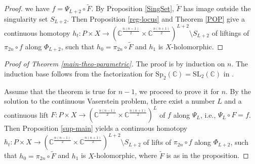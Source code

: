 \documentclass[10pt]{amsart}
\theoremstyle{remark}
\begin{document}
\begin{proof}
we have $f = \Psi_{L+2} \circ \tilde F$. By Proposition \ref{SingSet}, $\tilde{F}$ has image outside the singularity set $S_{L+2}$. Then Proposition \ref{reg-locus} and Theorem \ref{POP} give a continuous homotopy $h_t: P \times X \to (\mathbb{C}^{\frac{n(n-1)}{2}} \times \mathbb{C}^{\frac{n(n+1)}{2}})^{L+2}\setminus S_{L+2}$ of liftings of $\pi_{2n} \circ f$ along $\Phi_{L+2}$, such that $h_0 = \pi_{2n} \circ \tilde F $ and $h_1$ is $X$-holomorphic.
\end{proof}

\begin{proof}[Proof of Theorem \ref{main-theo-parametric}]
The proof is by induction on $n$. The induction base follows from the factorization for $\mathrm{Sp}_2(\mathbb{C}) = \mathrm{SL}_2(\mathbb{C})$ in \cite{KI}.

 Assume that the theorem is true for $n-1$, we proceed to prove it for $n$. By the solution to the continuous Vaserstein problem, there exist a number $L$ and a continuous lift $F : P \times X \to (\mathbb{C}^{\frac{n(n-1)}{2}} \times \mathbb{C}^{\frac{n(n+1)}{2}})^L$ of $f$ along $\Psi_L$, i.e., $\Psi_L \circ F = f$. Then Proposition \ref{sup-main} yields a continuous homotopy $h_t: P \times X \to (\mathbb{C}^{\frac{n(n-1)}{2}} \times \mathbb{C}^{\frac{n(n+1)}{2}})^{L+2}\setminus S_{L+2}$ of lifts of $\pi_{2n} \circ f$ along $\Phi_{L+2}$, such that $h_0 = \pi_{2n} \circ \tilde F $ and $h_1$ is $X$-holomorphic, where $\tilde{F}$ is as in the proposition. 
 

\end{proof}
\end{document}

